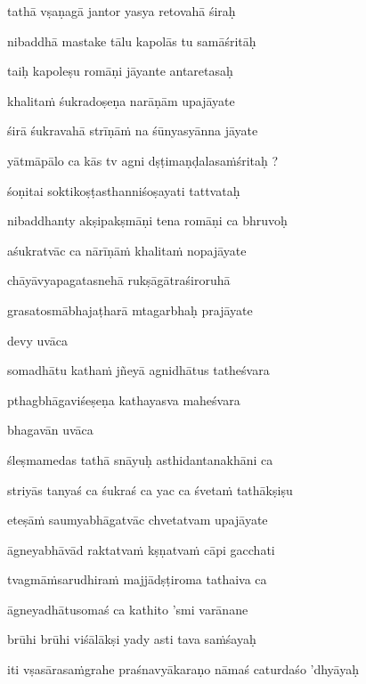 tathā vṣaṇagā jantor yasya retovahā śiraḥ\thinspace{\danda} \dontdisplaylinenum

nibaddhā mastake tālu kapolās tu samāśritāḥ \veg\dontdisplaylinenum

taiḥ kapoleṣu romāṇi jāyante antaretasaḥ\thinspace{\dandab} \dontdisplaylinenum

khalitaṁ śukradoṣeṇa narāṇām upajāyate \veg\dontdisplaylinenum

śirā śukravahā strīṇāṁ na śūnyasyānna jāyate\thinspace{\dandab} \dontdisplaylinenum

yātmāpālo ca kās tv agni dṣṭimaṇḍalasaṁśritaḥ ? \veg\dontdisplaylinenum

śoṇitai soktikoṣṭasthanniśoṣayati tattvataḥ\thinspace{\dandab} \dontdisplaylinenum

nibaddhanty akṣipakṣmāṇi tena romāṇi ca bhruvoḥ \veg\dontdisplaylinenum

aśukratvāc ca nārīṇāṁ khalitaṁ nopajāyate\thinspace{\dandab} \dontdisplaylinenum

chāyāvyapagatasnehā rukṣāgātraśiroruhā \danda\dontdisplaylinenum

grasatosmābhajaṭharā mtagarbhaḥ prajāyate \veg\dontdisplaylinenum

devy uvāca~{\dandab}\dontdisplaylinenum 

somadhātu kathaṁ jñeyā agnidhātus tatheśvara\thinspace{\danda} \dontdisplaylinenum

pthagbhāgaviśeṣeṇa kathayasva maheśvara \veg\dontdisplaylinenum

bhagavān uvāca~{\dandab}\dontdisplaylinenum 

śleṣmamedas tathā snāyuḥ asthidantanakhāni ca\thinspace{\danda} \dontdisplaylinenum

striyās tanyaś ca śukraś ca yac ca śvetaṁ tathākṣiṣu \veg\dontdisplaylinenum

eteṣāṁ saumyabhāgatvāc chvetatvam upajāyate\thinspace{\dandab} \dontdisplaylinenum

āgneyabhāvād raktatvaṁ kṣṇatvaṁ cāpi gacchati \veg\dontdisplaylinenum

tvagmāṁsarudhiraṁ majjādṣṭiroma tathaiva ca\thinspace{\dandab} \dontdisplaylinenum

āgneyadhātusomaś ca kathito 'smi varānane \danda\dontdisplaylinenum

brūhi brūhi viśālākṣi yady asti tava saṁśayaḥ \veg\dontdisplaylinenum


\jump
\begin{center}
\ketdanda iti vṣasārasaṁgrahe praśnavyākaraṇo nāmaś caturdaśo 'dhyāyaḥ\ketdanda
\end{center}
\dontdisplaylinenum\vers 
\bekveg\szamveg\vfill\phpspagebreak\szam\bek{}
\thispagestyle{empty}



